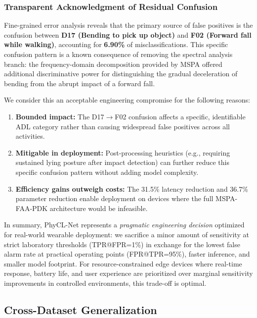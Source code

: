 \documentclass{article}
\begin{document}
\subsubsection{Transparent Acknowledgment of Residual Confusion}

Fine-grained error analysis reveals that the primary source of false positives is the confusion between \textbf{D17 (Bending to pick up object)} and \textbf{F02 (Forward fall while walking)}, accounting for \textbf{6.90\%} of misclassifications. This specific confusion pattern is a known consequence of removing the spectral analysis branch: the frequency-domain decomposition provided by MSPA offered additional discriminative power for distinguishing the gradual deceleration of bending from the abrupt impact of a forward fall.

We consider this an acceptable engineering compromise for the following reasons:
\begin{enumerate}
    \item \textbf{Bounded impact:} The D17$\to$F02 confusion affects a specific, identifiable ADL category rather than causing widespread false positives across all activities.
    \item \textbf{Mitigable in deployment:} Post-processing heuristics (e.g., requiring sustained lying posture after impact detection) can further reduce this specific confusion pattern without adding model complexity.
    \item \textbf{Efficiency gains outweigh costs:} The 31.5\% latency reduction and 36.7\% parameter reduction enable deployment on devices where the full MSPA-FAA-PDK architecture would be infeasible.
\end{enumerate}

In summary, PhyCL-Net represents a \textit{pragmatic engineering decision} optimized for real-world wearable deployment: we sacrifice a minor amount of sensitivity at strict laboratory thresholds (TPR@FPR=1\%) in exchange for the lowest false alarm rate at practical operating points (FPR@TPR=95\%), faster inference, and smaller model footprint. For resource-constrained edge devices where real-time response, battery life, and user experience are prioritized over marginal sensitivity improvements in controlled environments, this trade-off is optimal.

\subsection{Cross-Dataset Generalization}
\end{document}
